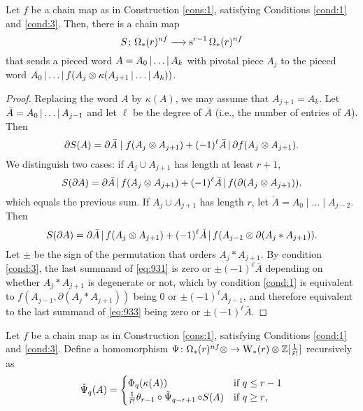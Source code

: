 \begin{proposition} Let $f$ be a chain map as in Construction \ref{cons:1}, satisfying Conditions \eqref{cond:1} and \eqref{cond:3}. Then, there is a chain map
	\[
	S \colon  \Omega_*(r)^{nf}\longrightarrow \operatorname{s}^{r-1}\Omega_*(r)^{nf}
	\]
	that sends a pieced word $A = A_0\operatorname{|} \ldots\operatorname{|} A_k$ with pivotal piece $A_j$ to the pieced word $ A_0\operatorname{|} \ldots\operatorname{|} f(A_j \otimes  \kappa(A_{j+1}\operatorname{|} \ldots\operatorname{|} A_k))$.
\end{proposition}
\begin{proof}
	Replacing the word $A$ by $\kappa(A)$, we may assume that $A_{j+1} = A_k$. Let $\bar{A} = A_0\operatorname{|} \ldots\operatorname{|} A_{j-1}$ and let $\ell$ be the degree of $\bar{A}$ (i.e., the number of entries of $A$). Then %
	\begin{equation}\label{eq:931}
		\partial S(A) = \partial \bar{A}\mid f(A_{j} \otimes  A_{j+1}) + (-1)^{\ell}\bar{A}\operatorname{|} \partial f(A_{j} \otimes  A_{j+1}).
	\end{equation}
	We distinguish two cases: if $A_j\cup A_{j+1}$ has length at least $r+1$,
	\[S(\partial A) = \partial \bar{A}\operatorname{|} f(A_j \otimes  A_{j+1}) + (-1)^{\ell}\bar{A}\operatorname{|} f(\partial (A_j \otimes  A_{j+1})),\]
	which equals the previous sum. If $A_j\cup A_{j+1}$ has length $r$, let $\check{A} = A_0\mid \ldots\mid A_{j-2}$. Then
	\begin{equation}\label{eq:933}
		S(\partial A) = \partial \bar{A}\operatorname{|} f(A_j \otimes  A_{j+1}) + (-1)^\ell \check{A}\operatorname{|} f(A_{j-1} \otimes  \partial(A_j*A_{j+1})).
	\end{equation}
	Let $\pm$ be the sign of the permutation that orders $A_j*A_{j+1}$. By condition \eqref{cond:3}, the last summand of \eqref{eq:931} is zero or $\pm(-1)^\ell\bar{A}$ depending on whether $A_j*A_{j+1}$ is degenerate or not, which by condition \eqref{cond:1} is equivalent to $f(A_{j-1},\partial(A_j*A_{j+1}))$ being $0$ or $\pm(-1)^{\ell}A_{j-1}$, and therefore equivalent to the last summand of \eqref{eq:933} being zero or $\pm(-1)^{\ell}\bar{A}$.
\end{proof}


\begin{definition}\label{def:psiom}
	Let $f$ be a chain map as in Construction \ref{cons:1}, satisfying Conditions \eqref{cond:1} and \eqref{cond:3}. Define a homomorphism $\Psi \colon  \Omega_*(r)^{nf} \otimes  \to \operatorname{W}_{*}(r) \otimes  \mathbb{Z}[\frac{1}{\tilde{r}!}]$ recursively as
	\[\operatorname{\check{\Psi}}_q(A) = \begin{cases} \Phi_q(\kappa(A)) & \text{if $q\leq r-1$} \\
		\frac{1}{\tilde{r}!}\theta_{r-1}\circ \operatorname{\check{\Psi}}_{q-r+1}\circ S(A) & \text{if $q\geq r$,}\end{cases}\]
\end{definition}

